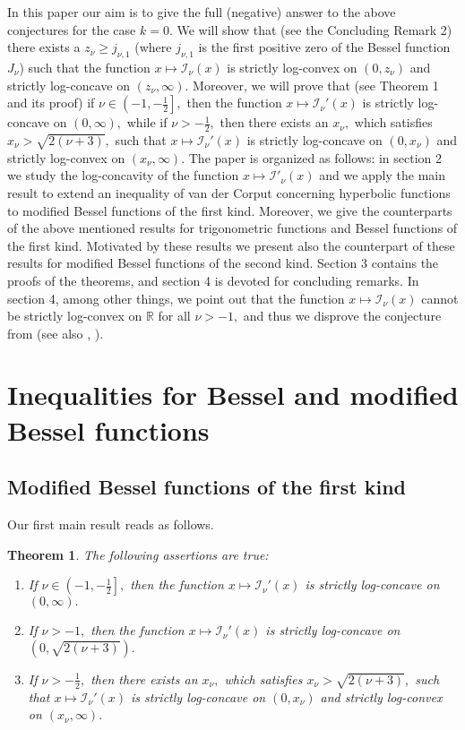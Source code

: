 \documentclass[10pt]{amsart}
\newtheorem{theorem}{Theorem}
\begin{document}
In this paper our aim is to give the full (negative) answer to the above conjectures for the case $k=0.$ We will show that (see the Concluding Remark 2) there exists a $z_{\nu}\geq j_{\nu,1}$ (where $j_{\nu,1}$ is the first positive zero of the Bessel function $J_{\nu}$) such that the function $x \mapsto \mathcal{I}_{\nu}(x)$ is strictly log-convex on $(0,z_{\nu})$ and strictly log-concave on $(z_{\nu},\infty).$ Moreover, we will prove that (see Theorem 1 and its proof) if $\nu\in\left(-1,-\frac{1}{2}\right],$ then the function $x\mapsto\mathcal{I}_{\nu}'(x)$ is strictly log-concave on $(0,\infty),$ while if $\nu>-\frac{1}{2},$ then there exists an $x_{\nu},$ which satisfies $x_{\nu}>\sqrt{2(\nu+3)},$ such that $x\mapsto\mathcal{I}_{\nu}'(x)$ is strictly log-concave on $(0,x_{\nu})$ and strictly log-convex on $(x_{\nu},\infty).$ The paper is organized as follows: in section 2 we study the log-concavity of the function $x\mapsto\mathcal{I}'_{\nu}(x)$ and we apply the main result to extend an inequality of van der Corput concerning hyperbolic functions to modified Bessel functions of the first kind. Moreover, we give the counterparts of the above mentioned results for trigonometric functions and Bessel functions of the first kind. Motivated by these results we present also the counterpart of these results for modified Bessel functions of the second kind. Section 3 contains the proofs of the theorems, and section 4 is devoted for concluding remarks. In section 4, among other things, we point out that the function $x \mapsto \mathcal{I}_{\nu}(x)$
cannot be strictly log-convex on $\mathbb{R}$ for all $\nu> -1,$ and thus we disprove the conjecture from \cite[p. 271]{bane1} (see also \cite[p. 100]{bariczPhD}, \cite[p. 187]{barspringer}).

\section{\bf Inequalities for Bessel and modified Bessel functions}
\setcounter{equation}{0}

\subsection{Modified Bessel functions of the first kind} Our first main result reads as follows.
\begin{theorem}\label{th1}
The following assertions are true:
\begin{enumerate}
\item[(a)] If $\nu\in\left(-1,-\frac{1}{2}\right],$ then the function $x\mapsto\mathcal{I}_{\nu}'(x)$ is strictly log-concave on $(0,\infty).$
\item[(b)] If $\nu>-1,$ then the function $x\mapsto\mathcal{I}_{\nu}'(x)$ is strictly log-concave on $\left(0,\sqrt{2(\nu+3)}\right).$
\item[(c)] If $\nu>-\frac{1}{2},$ then there exists an $x_{\nu},$ which satisfies $x_{\nu}>\sqrt{2(\nu+3)},$ such that $x\mapsto\mathcal{I}_{\nu}'(x)$ is strictly log-concave on $(0,x_{\nu})$ and strictly log-convex on $(x_{\nu},\infty).$
\end{enumerate}
\end{theorem}
\end{document}
